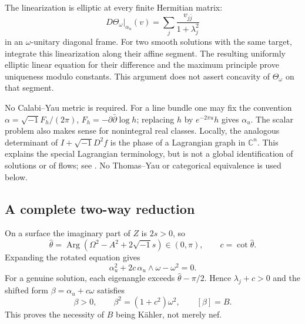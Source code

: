 \documentclass[12pt,reqno]{amsart}
\newcommand{\ii}{\sqrt{-1}}
\newcommand{\C}{\mathbb C}
\newcommand{\Th}{\Theta_\omega}
\newcommand{\hth}{\widehat\theta}
\begin{document}
The linearization is elliptic at every finite Hermitian matrix:
\begin{equation}\label{eq:linearization}
 D\Th\big|_{\alpha_u}(v)
      =\sum_j\frac{v_{j\bar j}}{1+\lambda_j^2}
\end{equation}
in an $\omega$-unitary diagonal frame. For two smooth solutions with the same target, integrate this linearization along their affine segment. The resulting uniformly elliptic linear equation for their difference and the maximum principle prove uniqueness modulo constants. This argument does not assert concavity of $\Th$ on that segment.

No Calabi--Yau metric is required. For a line bundle one may fix the convention $\alpha=\ii F_h/(2\pi)$, $F_h=-\partial\bar\partial\log h$; replacing $h$ by $e^{-2\pi u}h$ gives $\alpha_u$. The scalar problem also makes sense for nonintegral real classes. Locally, the analogous determinant of $I+\ii D^2f$ is the phase of a Lagrangian graph in $\C^n$. This explains the special Lagrangian terminology, but is not a global identification of solutions or of flows; see \cite{JY}. No Thomas--Yau or categorical equivalence is used below.

\subsection{A complete two-way reduction}
On a surface the imaginary part of $Z$ is $2s>0$, so
\[
 \hth=\operatorname{Arg}(\Omega^2-A^2+2\ii s)\in(0,\pi),
 \qquad c=\cot\hth.
\]
Expanding the rotated equation gives
\begin{equation}\label{eq:surface-expand}
 \alpha_u^2+2c\,\alpha_u\wedge\omega-\omega^2=0.
\end{equation}
For a genuine solution, each eigenangle exceeds $\hth-\pi/2$. Hence $\lambda_j+c>0$ and the shifted form $\beta=\alpha_u+c\omega$ satisfies
\begin{equation}\label{eq:MA}
 \beta>0,\qquad \beta^2=(1+c^2)\omega^2,\qquad [\beta]=B.
\end{equation}
This proves the necessity of $B$ being K\"ahler, not merely nef.
\end{document}
